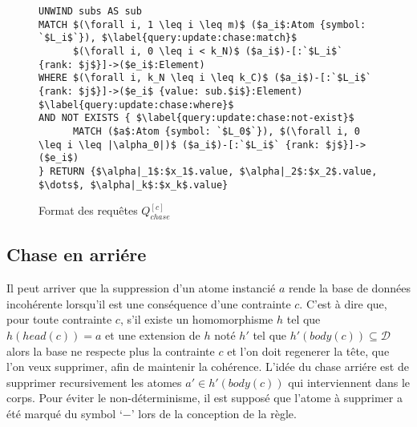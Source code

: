 \begin{figure}[ht]
	\begin{lstlisting}[mathescape]
UNWIND subs AS sub
MATCH $(\forall i, 1 \leq i \leq m)$ ($a_i$:Atom {symbol: `$L_i$`}), $\label{query:update:chase:match}$
      $(\forall i, 0 \leq i < k_N)$ ($a_i$)-[:`$L_i$` {rank: $j$}]->($e_i$:Element)
WHERE $(\forall i, k_N \leq i \leq k_C)$ ($a_i$)-[:`$L_i$` {rank: $j$}]->($e_i$ {value: sub.$i$}:Element) $\label{query:update:chase:where}$
AND NOT EXISTS { $\label{query:update:chase:not-exist}$
      MATCH ($a$:Atom {symbol: `$L_0$`}), $(\forall i, 0 \leq i \leq |\alpha_0|)$ ($a_i$)-[:`$L_i$` {rank: $j$}]->($e_i$)
} RETURN {$\alpha|_1$:$x_1$.value, $\alpha|_2$:$x_2$.value, $\dots$, $\alpha|_k$:$x_k$.value}
	\end{lstlisting}
	\caption{Format des requêtes $Q_{chase}^{[c]}$}
    \label{algo:update:chase:query}
\end{figure}

\begin{example}
    \label{ex:update:chase:query}

\end{example}

\subsection{Chase en arriére}
Il peut arriver que la suppression d'un atome instancié $a$ rende la base de données incohérente lorsqu'il est une conséquence d'une contrainte $c$.
C'est à dire que, pour toute contrainte $c$, s'il existe un homomorphisme $h$ tel que $h(head(c)) = a$ et une extension de $h$ noté $h'$ tel que $h'(body(c)) \subseteq \mathcal{D}$ alors la base ne respecte plus la contrainte $c$ et l'on doit regenerer la tête, que l'on veux supprimer, afin de maintenir la cohérence.
L'idée du chase arriére est de supprimer recursivement les atomes $a' \in h'(body(c))$ qui interviennent dans le corps.
Pour éviter le non-déterminisme, il est supposé que l'atome à supprimer a été marqué du symbol `$-$' lors de la conception de la règle.

